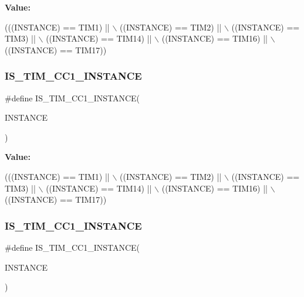{\bfseries Value\+:}
\begin{DoxyCode}
(((INSTANCE) == TIM1)    || \(\backslash\)
   ((INSTANCE) == TIM2)    || \(\backslash\)
   ((INSTANCE) == TIM3)    || \(\backslash\)
   ((INSTANCE) == TIM14)   || \(\backslash\)
   ((INSTANCE) == TIM16)   || \(\backslash\)
   ((INSTANCE) == TIM17))
\end{DoxyCode}
\mbox{\label{group___exported__macro_ga0c02efc77b1bfb640d7f6593f58ad464}} 
\subsubsection{\texorpdfstring{I\+S\+\_\+\+T\+I\+M\+\_\+\+C\+C1\+\_\+\+I\+N\+S\+T\+A\+N\+CE}{IS\_TIM\_CC1\_INSTANCE}\hspace{0.1cm}{\footnotesize\ttfamily [12/16]}}
{\footnotesize\ttfamily \#define I\+S\+\_\+\+T\+I\+M\+\_\+\+C\+C1\+\_\+\+I\+N\+S\+T\+A\+N\+CE(\begin{DoxyParamCaption}\item[{}]{I\+N\+S\+T\+A\+N\+CE }\end{DoxyParamCaption})}

{\bfseries Value\+:}
\begin{DoxyCode}
(((INSTANCE) == TIM1)    || \(\backslash\)
   ((INSTANCE) == TIM2)    || \(\backslash\)
   ((INSTANCE) == TIM3)    || \(\backslash\)
   ((INSTANCE) == TIM14)   || \(\backslash\)
   ((INSTANCE) == TIM16)   || \(\backslash\)
   ((INSTANCE) == TIM17))
\end{DoxyCode}
\mbox{\label{group___exported__macro_ga0c02efc77b1bfb640d7f6593f58ad464}} 
\subsubsection{\texorpdfstring{I\+S\+\_\+\+T\+I\+M\+\_\+\+C\+C1\+\_\+\+I\+N\+S\+T\+A\+N\+CE}{IS\_TIM\_CC1\_INSTANCE}\hspace{0.1cm}{\footnotesize\ttfamily [13/16]}}
{\footnotesize\ttfamily \#define I\+S\+\_\+\+T\+I\+M\+\_\+\+C\+C1\+\_\+\+I\+N\+S\+T\+A\+N\+CE(\begin{DoxyParamCaption}\item[{}]{I\+N\+S\+T\+A\+N\+CE }\end{DoxyParamCaption})}

